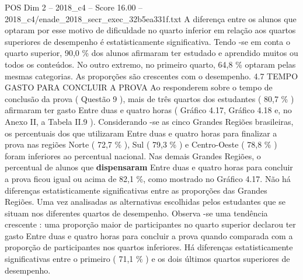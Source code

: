\begin{textsample}{POS Dim 2 – 2018\_c4 – Score 16.00 – 2018\_c4/enade\_2018\_secr\_exec\_32b5ea331f.txt}
A diferença entre os alunos que optaram por esse motivo de dificuldade no quarto inferior em relação aos quartos superiores de desempenho é estatisticamente significativa.
Tendo -se em conta o quarto superior, 90,0 \% dos alunos afirmaram ter estudado e aprendido muitos ou todos os conteúdos.
No outro extremo, no primeiro quarto, 64,8 \% optaram pelas mesmas categorias.
As proporções são crescentes com o desempenho. 4.7 TEMPO GASTO PARA CONCLUIR A PROVA Ao responderem sobre o tempo de conclusão da prova ( Questão 9 ), mais de três quartos dos estudantes ( 80,7 \% ) afirmaram ter gasto Entre duas e quatro horas ( Gráfico 4.17, Gráfico 4.18 e, no Anexo II, a Tabela II.9 ).
Considerando -se as cinco Grandes Regiões brasileiras, os percentuais dos que utilizaram Entre duas e quatro horas para finalizar a prova nas regiões Norte ( 72,7 \% ), Sul ( 79,3 \% ) e Centro-Oeste ( 78,8 \% ) foram inferiores ao percentual nacional.
Nas demais Grandes Regiões, o percentual de alunos que \textbf{dispensaram} Entre duas e quatro horas para concluir a prova ficou igual ou acima de 82,1 \%, como mostrado no Gráfico 4.17.
Não há diferenças estatisticamente significativas entre as proporções das Grandes Regiões.
Uma vez analisadas as alternativas escolhidas pelos estudantes que se situam nos diferentes quartos de desempenho.
Observa -se uma tendência crescente : uma proporção maior de participantes no quarto superior declarou ter gasto Entre duas e quatro horas para concluir a prova quando comparada com a proporção de participantes nos quartos inferiores.
Há diferenças estatisticamente significativas entre o primeiro ( 71,1 \% ) e os dois últimos quartos superiores de desempenho.

\end{textsample}
